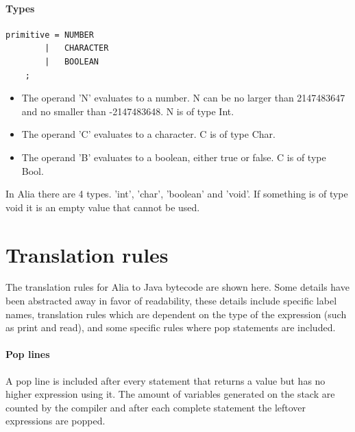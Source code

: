 \documentclass[paper=a4, fontsize=11pt]{article}
\numberwithin{equation}{section}		%
\numberwithin{figure}{section}			%
\numberwithin{table}{section}				%
\begin{document}
\paragraph{Types}
\begin{verbatim}
primitive =	NUMBER
		|	CHARACTER
		|	BOOLEAN
	;
\end{verbatim}
\begin{itemize}
\item The operand 'N' evaluates to a number. N can be no larger than 2147483647 and no smaller than -2147483648. N is of type Int.
\item The operand 'C' evaluates to a character. C is of type Char.
\item The operand 'B' evaluates to a boolean, either true or false. C is of type Bool.
\end{itemize}
In Alia there are 4 types. 'int', 'char', 'boolean' and 'void'. If something is of type void it is an empty value that cannot be used.

\section{Translation rules} %
The translation rules for Alia to Java bytecode are shown here. Some details have been abstracted away in favor of readability, these details include specific label names, translation rules which are dependent on the type of the expression (such as print and read), and some specific rules where pop statements are included.

\paragraph{Pop lines}
A pop line is included after every statement that returns a value but has no higher expression using it. The amount of variables generated on the stack are counted by the compiler and after each complete statement the leftover expressions are popped.
\end{document}

